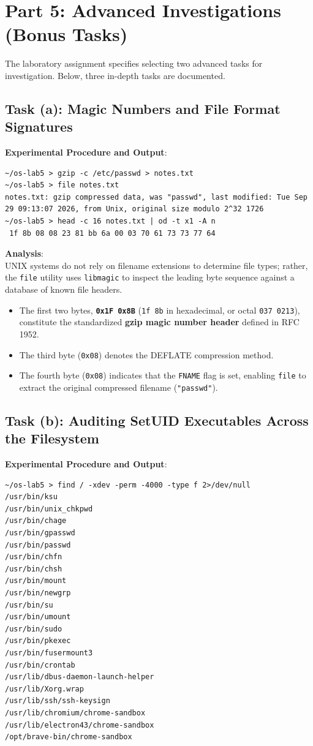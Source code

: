 \documentclass[12pt,a4paper]{article}
\begin{document}
\newpage

\section{Part 5: Advanced Investigations (Bonus Tasks)}

The laboratory assignment specifies selecting two advanced tasks for investigation. Below, three in-depth tasks are documented.

\subsection{Task (a): Magic Numbers and File Format Signatures}
\textbf{Experimental Procedure and Output}:
\begin{lstlisting}[style=consolestyle]
~/os-lab5 > gzip -c /etc/passwd > notes.txt
~/os-lab5 > file notes.txt
notes.txt: gzip compressed data, was "passwd", last modified: Tue Sep 29 09:13:07 2026, from Unix, original size modulo 2^32 1726
~/os-lab5 > head -c 16 notes.txt | od -t x1 -A n
 1f 8b 08 08 23 81 bb 6a 00 03 70 61 73 73 77 64
\end{lstlisting}

\textbf{Analysis}: \\
UNIX systems do not rely on filename extensions to determine file types; rather, the \texttt{file} utility uses \texttt{libmagic} to inspect the leading byte sequence against a database of known file headers. 
\begin{itemize}
    \item The first two bytes, \textbf{\texttt{0x1F 0x8B}} (\texttt{1f 8b} in hexadecimal, or octal \texttt{037 0213}), constitute the standardized \textbf{gzip magic number header} defined in RFC 1952.
    \item The third byte (\texttt{0x08}) denotes the DEFLATE compression method.
    \item The fourth byte (\texttt{0x08}) indicates that the \texttt{FNAME} flag is set, enabling \texttt{file} to extract the original compressed filename (\texttt{"passwd"}).
\end{itemize}

\subsection{Task (b): Auditing SetUID Executables Across the Filesystem}
\textbf{Experimental Procedure and Output}:
\begin{lstlisting}[style=consolestyle]
~/os-lab5 > find / -xdev -perm -4000 -type f 2>/dev/null
/usr/bin/ksu
/usr/bin/unix_chkpwd
/usr/bin/chage
/usr/bin/gpasswd
/usr/bin/passwd
/usr/bin/chfn
/usr/bin/chsh
/usr/bin/mount
/usr/bin/newgrp
/usr/bin/su
/usr/bin/umount
/usr/bin/sudo
/usr/bin/pkexec
/usr/bin/fusermount3
/usr/bin/crontab
/usr/lib/dbus-daemon-launch-helper
/usr/lib/Xorg.wrap
/usr/lib/ssh/ssh-keysign
/usr/lib/chromium/chrome-sandbox
/usr/lib/electron43/chrome-sandbox
/opt/brave-bin/chrome-sandbox
\end{lstlisting}
\end{document}
